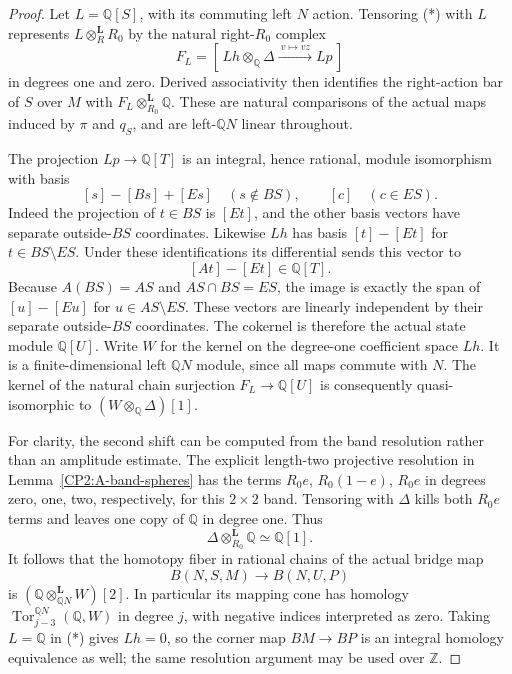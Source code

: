 \begin{proof}
Let $L=\mathbb Q[S]$, with its commuting left $N$ action.
Tensoring (*) with $L$ represents $L\otimes_R^{\mathbf L}R_0$
by the natural right-$R_0$ complex
\[
 F_L=[\,Lh\otimes_{\mathbb Q}\Delta
                    \xrightarrow{\ v\mapsto vz\ }Lp\,]
\]
in degrees one and zero.  Derived associativity then identifies
the right-action bar of $S$ over $M$ with
$F_L\otimes_{R_0}^{\mathbf L}\mathbb Q$.
These are natural comparisons of the actual maps induced by
$\pi$ and $q_S$, and are left-$\mathbb QN$ linear throughout.

The projection $Lp\to\mathbb Q[T]$ is an integral, hence rational,
module isomorphism with basis
\[
 [s]-[Bs]+[Es]\quad(s\notin BS),\qquad [c]\quad(c\in ES).
\]
Indeed the projection of $t\in BS$ is $[Et]$, and the other
basis vectors have separate outside-$BS$ coordinates.  Likewise
$Lh$ has basis $[t]-[Et]$ for $t\in BS\setminus ES$.
Under these identifications its differential sends this vector to
\[
 [At]-[Et]\in\mathbb Q[T].
\]
Because $A(BS)=AS$ and $AS\cap BS=ES$, the image is exactly the
span of $[u]-[Eu]$ for $u\in AS\setminus ES$.  These vectors
are linearly independent by their separate outside-$BS$
coordinates.  The cokernel is therefore the actual state module
$\mathbb Q[U]$.  Write $W$ for the kernel on the degree-one
coefficient space $Lh$.  It is a finite-dimensional left
$\mathbb QN$ module, since all maps commute with $N$.
The kernel of the natural chain surjection
$F_L\to\mathbb Q[U]$ is consequently quasi-isomorphic to
$(W\otimes_{\mathbb Q}\Delta)[1]$.

For clarity, the second shift can be computed from the band
resolution rather than an amplitude estimate.  The explicit
length-two projective resolution in
Lemma~\ref{CP2:A-band-spheres} has the terms
$R_0e$, $R_0(1-e)$, $R_0e$ in degrees zero, one, two,
respectively, for this $2\times2$ band.  Tensoring with
$\Delta$ kills both $R_0e$ terms and leaves one copy of
$\mathbb Q$ in degree one.  Thus
\[
 \Delta\otimes_{R_0}^{\mathbf L}\mathbb Q\simeq\mathbb Q[1].
\]
It follows that the homotopy fiber in rational chains of the
actual bridge map
\[
 B(N,S,M)\longrightarrow B(N,U,P)
\]
is $(\mathbb Q\otimes_{\mathbb QN}^{\mathbf L}W)[2]$.
In particular its mapping cone has homology
$\operatorname{Tor}^{\mathbb QN}_{j-3}(\mathbb Q,W)$ in
degree $j$, with negative indices interpreted as zero.
Taking $L=\mathbb Q$ in (*) gives $Lh=0$, so the corner map
$BM\to BP$ is an integral homology equivalence as well;
the same resolution argument may be used over $\mathbb Z$.


\end{proof}
